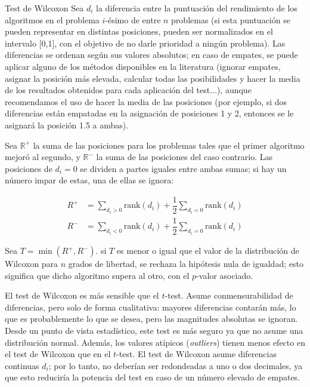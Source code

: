 \begin{definicion}{Test de Wilcoxon}
Sea $d_i$ la diferencia entre la puntuación del rendimiento de los algoritmos en el problema $i$-ésimo de entre $n$ problemas (si esta puntuación se pueden representar en distintas posiciones, pueden ser normalizados en el intervalo [0,1], con el objetivo de no darle prioridad a ningún problema). 
Las diferencias se ordenan según sus valores absolutos; en caso de empates, se puede aplicar alguno de los métodos disponibles en la literatura (ignorar empates, asignar la posición más elevada, calcular todas las posibilidades y hacer la media de los resultados obtenidos para cada aplicación del test...), aunque recomendamos el uso de hacer la media de las posiciones (por ejemplo, si dos diferencias están empatadas en la asignación de posiciones 1 y 2, entonces se le asignará la posición 1.5 a ambas).
\end{definicion} 

Sea $\mathbb{R}^+$ la suma de las posiciones para los problemas tales que el primer algoritmo mejoró al segundo, y $\mathbb{R}^-$ la suma de las posiciones del caso contrario. 
Las posiciones de $d_i = 0$ se dividen a partes iguales entre ambas sumas; si hay un número impar de estas, una de ellas se ignora:

\begin{equation}
\begin{aligned}
R^+ & = \sum_{d_i>0} \text{rank}(d_i) + \dfrac{1}{2} \sum_{d_i=0}\text{rank}(d_i) \\
R^- & = \sum_{d_i<0} \text{rank}(d_i) + \dfrac{1}{2} \sum_{d_i=0}\text{rank}(d_i) 
\end{aligned}
\label{eq:4.34}
\end{equation}

Sea $T = \min(R^+,R^-)$. 
si $T$ es menor o igual que el valor de la distribución de Wilcoxon para $n$ grados de libertad, se rechaza la hipótesis nula de igualdad; esto significa que dicho algoritmo supera al otro, con el $p$-valor asociado. 

El test de Wilcoxon es más sensible que el $t$-test. 
Asume conmensurabilidad de diferencias, pero solo de forma cualitativa: mayores diferencias contarán más, lo que es probablemente lo que se desea, pero las magnitudes absolutas se ignoran. 
Desde un punto de vista estadístico, este test es más seguro ya que no asume una distribución normal. 
Además, los valores atípicos (\textit{outliers}) tienen menos efecto en el test de Wilcoxon que en el $t$-test. 
El test de Wilcoxon asume diferencias continuas $d_i$; por lo tanto, no deberían ser redondeadas a uno o dos decimales, ya que esto reduciría la potencia del test en caso de un número elevado de empates. 

